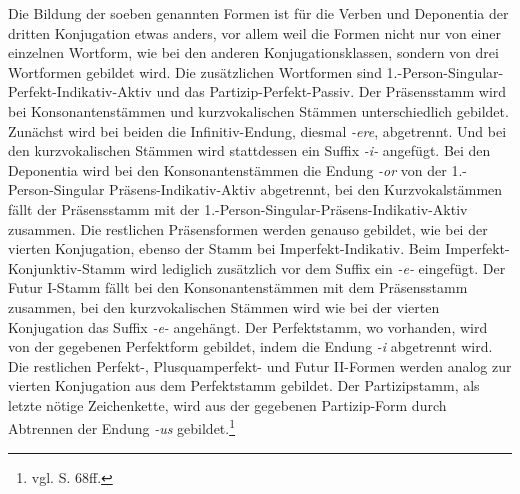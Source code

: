 Die Bildung der soeben genannten Formen ist für die Verben und Deponentia der dritten Konjugation etwas anders, vor allem weil die Formen nicht nur von einer einzelnen Wortform, wie bei den anderen Konjugationsklassen, sondern von drei Wortformen gebildet wird. Die zusätzlichen Wortformen sind 1.-Person-Singular-Perfekt-Indikativ-Aktiv und das Partizip-Perfekt-Passiv. Der Präsensstamm wird bei Konsonantenstämmen und kurzvokalischen Stämmen unterschiedlich gebildet. Zunächst wird bei beiden die Infinitiv-Endung, diesmal \textit{-ere}, abgetrennt. Und bei den kurzvokalischen Stämmen wird stattdessen ein Suffix \textit{-i-} angefügt. Bei den Deponentia wird bei den Konsonantenstämmen die Endung \textit{-or} von der 1.-Person-Singular Präsens-Indikativ-Aktiv abgetrennt, bei den Kurzvokalstämmen fällt der Präsensstamm mit der 1.-Person-Singular-Präsens-Indikativ-Aktiv zusammen. Die restlichen Präsensformen werden genauso gebildet, wie bei der vierten Konjugation, ebenso der Stamm bei Imperfekt-Indikativ. Beim Imperfekt-Konjunktiv-Stamm wird lediglich zusätzlich vor dem Suffix ein \textit{-e-} eingefügt. Der Futur I-Stamm fällt bei den Konsonantenstämmen mit dem Präsensstamm zusammen, bei den kurzvokalischen Stämmen wird wie bei der vierten Konjugation das Suffix \textit{-e-} angehängt. Der Perfektstamm, wo vorhanden, wird von der gegebenen Perfektform gebildet, indem die Endung \textit{-i} abgetrennt wird. Die restlichen Perfekt-, Plusquamperfekt- und Futur II-Formen werden analog zur vierten Konjugation aus dem Perfektstamm gebildet. Der Partizipstamm, als letzte nötige Zeichenkette, wird aus der gegebenen Partizip-Form durch Abtrennen der Endung \textit{-us} gebildet.\footnote{vgl. \cite{BAYER-LINDAUER1994} S. 68ff.} \par
